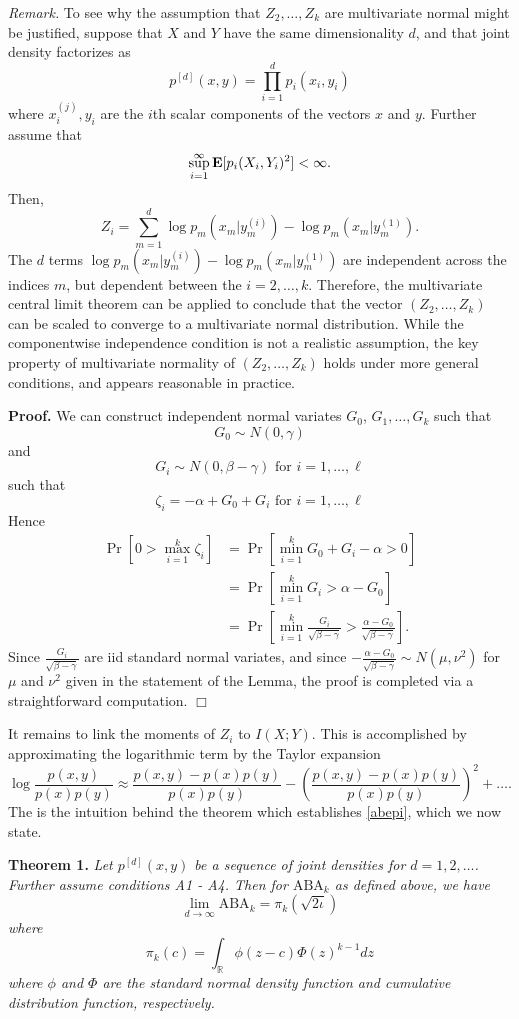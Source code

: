\emph{Remark.}
To see why the assumption that $Z_2,\hdots, Z_k$ are multivariate
normal might be justified, suppose that $X$ and $Y$ have the same
dimensionality $d$, and that joint density factorizes as
\[
p^{[d]}(x, y) = \prod_{i=1}^d p_i(x_i, y_i)
\]
where $x_i^{(j)}, y_i$ are the $i$th scalar components of the vectors
$x$ and $y$.  Further assume that
\[\sup_{i = 1}^\infty \textbf{E}[p_i(X_i,Y_i)^2] < \infty.\]
  Then,
\[
Z_i = \sum_{m=1}^d \log p_m(x_m | y^{(i)}_m) - \log p_m(x_m | y^{(1)}_m).
\]
The $d$ terms $\log
p_m(x_m | y^{(i)}_m) - \log p_m(x_m | y^{(1)}_m)$ are independent across
the indices $m$, but dependent between the $i = 2,\hdots, k$.
Therefore, the multivariate central limit theorem can be applied to
conclude that the vector $(Z_2,\hdots, Z_k)$ can be scaled to converge
to a multivariate normal distribution.  While the componentwise
independence condition is not a realistic assumption, the key property
of multivariate normality of $(Z_2,\hdots, Z_k)$ holds under more
general conditions, and appears reasonable in practice.

\textbf{Proof.}
We can construct independent normal variates $G_0$, $G_1,\hdots, G_k$
such that
\[
G_0 \sim N(0, \gamma)
\]
and
\[
G_i \sim N(0, \beta - \gamma)\text{ for }i =1,\hdots, \ell
\]
such that
\[
\zeta_i = -\alpha + G_0 + G_i \text{ for }i =1,\hdots,\ell
\]
Hence
\begin{align*}
\Pr[0 > \max_{i=1}^k \zeta_i] &= \Pr[\min_{i=1}^{k} G_0 + G_i - \alpha > 0]
\\&= \Pr[\min_{i=1}^{k} G_i > \alpha - G_0]
\\&= \Pr[\min_{i=1}^{k} \frac{G_i}{\sqrt{\beta - \gamma}} > \frac{\alpha - G_0}{\sqrt{\beta - \gamma}}].
\end{align*}
Since $\frac{G_i}{\sqrt{\beta - \gamma}}$ are iid standard normal variates, and since
$-\frac{\alpha - G_0}{\sqrt{\beta - \gamma}} \sim N(\mu,\nu^2)$ for $\mu$ and $\nu^2$ given in the statement of the Lemma, the proof is completed via a straightforward computation.  $\Box$



It remains to link the moments of $Z_i$ to $I(X;Y)$.  This is accomplished by approximating the logarithmic term by the Taylor expansion
\[
\log \frac{p(x, y)}{p(x) p(y)} \approx \frac{p(x, y) - p(x) p(y)}{p(x) p(y)} - \left(\frac{p(x, y) - p(x) p(y)}{p(x) p(y)}\right)^2 + \hdots.
\]
The is the intuition behind the theorem which establishes \eqref{abepi}, which we now state.

\textbf{Theorem 1.} \emph{Let $p^{[d]}(x, y)$ be a sequence of joint densities
for $d = 1,2,\hdots$.  Further assume conditions A1 - A4.
Then for $\text{ABA}_k$ as defined above, we have
\[
\lim_{d \to \infty} \text{ABA}_k = \pi_k(\sqrt{2 \iota})
\]
where
\[
\pi_k(c) = \int_{\mathbb{R}} \phi(z - c)  \Phi(z)^{k-1} dz
\]
where $\phi$ and $\Phi$ are the standard normal density function and
cumulative distribution function, respectively.}


